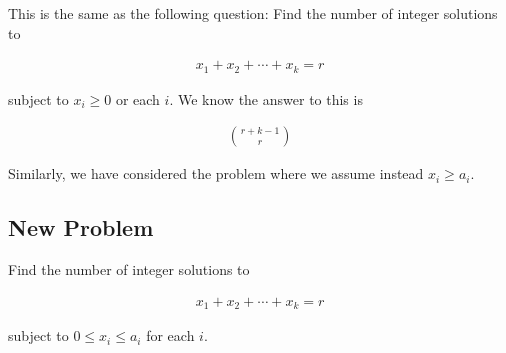 \documentclass{report}
\begin{document}
This is the same as the following question: Find the number
of integer solutions to

\begin{align*}
    x_1 + x_2 + \cdots + x_k = r
\end{align*}

subject to $x_i \ge 0$ or each $i$. We know the answer to this is

\begin{align*}
    \binom{r + k - 1}{r}
\end{align*}

Similarly, we have considered the problem where we assume instead
$x_i \ge a_i$.

\subsection*{New Problem}
Find the number of integer solutions to

\begin{align*}
    x_1 + x_2 + \cdots + x_k = r
\end{align*}

subject to $0 \le x_i \le a_i$ for each $i$. \\

\end{document}

